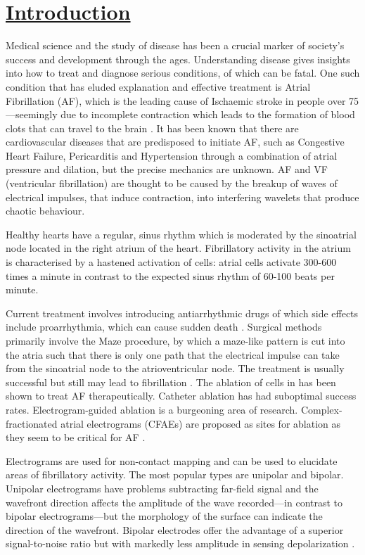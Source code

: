 \documentclass[twocolumn]{article}
\begin{document}
\section{\textbf{\underline{Introduction}}}

Medical science and the study of disease has been a crucial marker of society's success and development through the ages. Understanding disease gives insights into how to treat and diagnose serious conditions, of which can be fatal. One such condition that has eluded explanation and effective treatment is Atrial Fibrillation (AF), which is the leading cause of Ischaemic stroke in people over 75---seemingly due to incomplete contraction which leads to the formation of blood clots that can travel to the brain \cite{Hart}. It has been known that there are cardiovascular diseases that are predisposed to initiate AF, such as Congestive Heart Failure, Pericarditis and Hypertension through a combination of atrial pressure and dilation, but the precise mechanics are unknown. AF and VF (ventricular fibrillation) are thought to be caused by the breakup of waves of electrical impulses, that induce contraction, into interfering wavelets that produce chaotic behaviour. 

Healthy hearts have a regular, sinus  rhythm which is moderated by the sinoatrial node located in the right atrium of the heart. Fibrillatory activity in the atrium is characterised by a hastened activation of cells: atrial cells activate 300-600 times a minute in contrast to the expected sinus rhythm of 60-100 beats per minute.%

Current treatment involves introducing antiarrhythmic drugs of which side effects include proarrhythmia, which can cause sudden death \cite{Nattel1}. Surgical methods primarily involve the Maze procedure, by which a maze-like pattern is cut into the atria such that there is only one path that the electrical impulse can take from the sinoatrial node to the atrioventricular node. The treatment is usually successful but still may lead to fibrillation \cite{Tsui}. The ablation of cells in has been shown to treat AF therapeutically. Catheter ablation has had suboptimal success rates. Electrogram-guided ablation is a burgeoning area of research. Complex-fractionated atrial electrograms (CFAEs) are proposed as sites for ablation as they seem to be critical for AF \cite{Greek}. %

Electrograms are used for non-contact mapping and can be used to elucidate areas of fibrillatory activity. The most popular types are unipolar and bipolar. Unipolar electrograms have problems subtracting far-field signal and the wavefront direction affects the amplitude of the wave recorded---in contrast to bipolar electrograms---but the morphology of the surface can indicate the direction of the wavefront. Bipolar electrodes offer the advantage of a superior signal-to-noise ratio but with markedly less amplitude in sensing depolarization \cite{Vincent}. 
\end{document}
